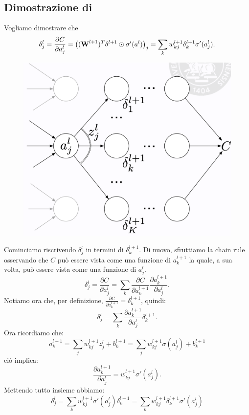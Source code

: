\subsection{Dimostrazione di }
Vogliamo dimostrare che
\begin{equation}
    \delta^l_j = \frac{\partial C}{\partial a^l_j} = \big( (\text{\textbf{W}}^{l+1})^T \delta^{l+1} \odot \sigma'(a^l) \big)_j =
    \sum_kw_{kj}^{l+1}\delta^{l+1}_k\sigma'(a^l_j).
\end{equation}
\begin{figure}[!h]
    \includegraphics[scale=.3]{images/backpropagation/proofBp2.png}
    \centering
\end{figure}

Cominciamo riscrivendo $\delta^l_j$ in termini di $\delta^{l+1}_k$. Di nuovo, sfruttiamo la chain rule osservando che $C$ può essere vista come una funzione di $a^{l+1}_k$ la quale, a sua volta, può essere vista come una funzione di $a^l_j$.
\begin{equation}
    \delta^l_j = \frac{\partial C}{\partial a^l_j} = \sum_k\frac{\partial C}{\partial a^{l+1}_k}\frac{\partial a_k^{l+1}}{\partial a^l_j}.
\end{equation}
Notiamo ora che, per definizione, $\frac{\partial C}{\partial a^{l+1}_k} = \delta_k^{l+1}$, quindi:
\begin{equation}
    \delta^l_j = \sum_k\frac{\partial a_k^{l+1}}{\partial a^l_j}\delta^{l+1}_k.
\end{equation}
Ora ricordiamo che:
\begin{equation}
    a^{l+1}_k = \sum_jw^{l+1}_{kj}z^l_j+b^{l+1}_k = \sum_jw^{l+1}_{kj}\sigma(a^l_j)+b^{l+1}_k
\end{equation}
ciò implica:
\begin{equation}
    \frac{\partial a_k^{l+1}}{\partial a^l_j} = w^{l+1}_{kj}\sigma'(a^l_j).
\end{equation}
Mettendo tutto insieme abbiamo:
\begin{equation}
    \delta^l_j = \sum_kw^{l+1}_{kj}\sigma'(a^l_j)\delta^{l+1}_k = \sum_kw^{l+1}_{kj}\delta^{l+1}_k\sigma'(a^l_j)
\end{equation}

